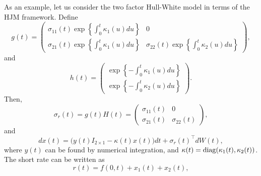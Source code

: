\documentclass[12pt]{article}
\begin{document}
  As an example, let us consider the two factor Hull-White model in terms of the HJM framework. Define
  \begin{equation}
    g(t)=\left(
            \begin{array}{cc}
              \sigma_{11}(t)\exp\left\{\int_0^t\kappa_1(u)du\right\} & 0 \\
              \sigma_{21}(t)\exp\left\{\int_0^t\kappa_1(u)du\right\} & \sigma_{22}(t)\exp\left\{\int_0^t\kappa_2(u)du\right\}
            \end{array}
         \right),
  \end{equation}
  and
  \begin{equation}
    h(t)=\left(
            \begin{array}{c}
              \exp\left\{-\int_0^t\kappa_1(u)du\right\}\\
              \exp\left\{-\int_0^t\kappa_2(u)du\right\}
            \end{array}
         \right).
  \end{equation}
  Then,
  \begin{equation}
    \sigma_r(t)=g(t)H(t)=\left(
            \begin{array}{cc}
              \sigma_{11}(t) & 0 \\
              \sigma_{21}(t) & \sigma_{22}(t)
            \end{array}
         \right),
  \end{equation}
  and
  \begin{equation}
    dx(t)=\Big(y(t)I_{2\times 1}-\kappa(t)x(t)\Big)dt+\sigma_r(t)^{{\top}}dW(t),
  \end{equation}
  where $y(t)$ can be found by numerical integration, and $\kappa(t)={\rm diag}(\kappa_1(t),\kappa_2(t))$. The short rate can be
  written as
  \begin{equation}
    r(t)=f(0,t)+x_1(t)+x_2(t),
  \end{equation}
\end{document}
